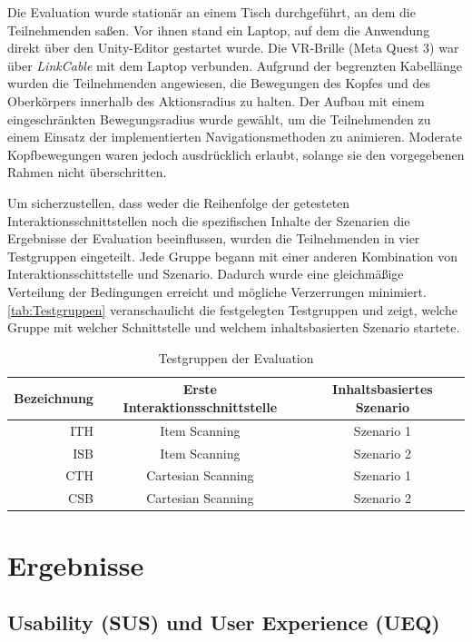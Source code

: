 Die Evaluation wurde stationär an einem Tisch durchgeführt, an dem die Teilnehmenden saßen. Vor ihnen stand ein Laptop, auf dem die Anwendung direkt über den Unity-Editor gestartet wurde. Die VR-Brille (Meta Quest 3) war über \textit{LinkCable} mit dem Laptop verbunden. Aufgrund der begrenzten Kabellänge wurden die Teilnehmenden angewiesen, die Bewegungen des Kopfes und des Oberkörpers innerhalb des Aktionsradius zu halten. Der Aufbau mit einem eingeschränkten Bewegungsradius wurde gewählt, um die Teilnehmenden zu einem Einsatz der implementierten Navigationsmethoden zu animieren. Moderate Kopfbewegungen waren jedoch ausdrücklich erlaubt, solange sie den vorgegebenen Rahmen nicht überschritten.

Um sicherzustellen, dass weder die Reihenfolge der getesteten Interaktionsschnittstellen noch die spezifischen Inhalte der Szenarien die Ergebnisse der Evaluation beeinflussen, wurden die Teilnehmenden in vier Testgruppen eingeteilt. Jede Gruppe begann mit einer anderen Kombination von Interaktionsschittstelle und Szenario. Dadurch wurde eine gleichmäßige Verteilung der Bedingungen erreicht und mögliche Verzerrungen minimiert. \autoref{tab:Testgruppen} veranschaulicht die festgelegten Testgruppen und zeigt, welche Gruppe mit welcher Schnittstelle und welchem inhaltsbasierten Szenario startete. 

\begin{table}[ht]
 \centering
 \begin{tabular}{r|c|c}
 Bezeichnung & Erste Interaktionsschnittstelle & Inhaltsbasiertes Szenario\\
 \hline
 ITH & Item Scanning & Szenario 1\\
 ISB & Item Scanning & Szenario 2\\
 CTH & Cartesian Scanning & Szenario 1\\
 CSB & Cartesian Scanning & Szenario 2\\
 \end{tabular}
 \caption{Testgruppen der Evaluation}
 \label{tab:Testgruppen}
\end{table}

\section{Ergebnisse}

\subsection{Usability (SUS) und User Experience (UEQ)}

